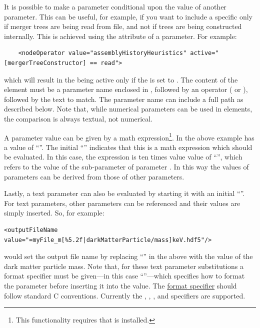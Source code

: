 It is possible to make a parameter conditional upon the value of another parameter. This can be useful, for example, if you want to include a specific  only if merger trees are being read from file, and not if trees are being constructed internally. This is achieved using the  attribute of a parameter. For example:
\begin{verbatim}
    <nodeOperator value="assemblyHistoryHeuristics" active="[mergerTreeConstructor] == read">
\end{verbatim}
which will result in the   being active only if the  is set to . The content of the  element must be a parameter name enclosed in \mono{[]}, followed by an operator (\mono{==} or \mono{!=}), followed by the text to match. The parameter name can include a full path as described below. Note that, while numerical parameters can be used in  elements, the comparison is always textual, not numerical.

A parameter value can be given by a math expression\footnote{This functionality requires that  is installed.}. In the above example  has a value of ``''. The initial ``\mono{=}'' indicates that this is a math expression which should be evaluated. In this case, the expression is ten times value value of ``'', which refers to the value of the sub-parameter  of parameter . In this way the values of parameters can be derived from those of other parameters.

Lastly, a text parameter can also be evaluated by starting it with an initial ``\mono{=}''. For text parameters, other parameters can be referenced and their values are simply inserted. So, for example:
\begin{verbatim}
<outputFileName value="=myFile_m[%5.2f|darkMatterParticle/mass]keV.hdf5"/>
\end{verbatim}
would set the output file name by replacing ``'' in the above with the value of the dark matter particle mass. Note that, for these text parameter substitutions a format specifier must be given---in this case ``''---which specifies how to format the parameter before inserting it into the value. The \href{https://www.w3resource.com/c-programming/stdio/c_library_method_sprintf.php}{format specifier} should follow standard C conventions. Currently the , , , and  specifiers are supported.

